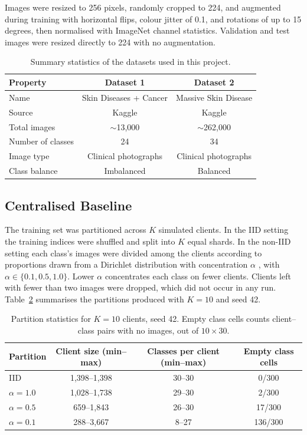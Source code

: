 \documentclass[12pt,openany,a4paper]{book}
\begin{document}
Images were resized to 256 pixels, randomly cropped to 224, and augmented during training with horizontal flips, colour jitter of 0.1, and rotations of up to 15 degrees, then normalised with ImageNet channel statistics. Validation and test images were resized directly to 224 with no augmentation.

\begin{table}[H]
  \centering
  \caption{Summary statistics of the datasets used in this project.}
  \label{tab:datasets}
  \renewcommand{\arraystretch}{1.3}
  \begin{tabular}{|l|c|c|}
    \hline
    \textbf{Property} & \textbf{Dataset 1} & \textbf{Dataset 2} \\ \hline
    Name & Skin Diseases + Cancer & Massive Skin Disease \\ \hline
    Source & Kaggle & Kaggle \\ \hline
    Total images & $\sim$13,000 & $\sim$262,000 \\ \hline
    Number of classes & 24 & 34 \\ \hline
    Image type & Clinical photographs & Clinical photographs \\ \hline
    Class balance & Imbalanced & Balanced \\ \hline
  \end{tabular}
\end{table}

\subsection{Centralised Baseline}
The training set was partitioned across $K$ simulated clients. In the IID setting the training indices were shuffled and split into $K$ equal shards. In the non-IID setting each class's images were divided among the clients according to proportions drawn from a Dirichlet distribution with concentration $\alpha$ \cite{hsuMeasuringEffectsNonIdentical2019}, with $\alpha \in \{0.1, 0.5, 1.0\}$. Lower $\alpha$ concentrates each class on fewer clients. Clients left with fewer than two images were dropped, which did not occur in any run. Table~\ref{tab:partition} summarises the partitions produced with $K = 10$ and seed 42.

\begin{table}[H]
  \centering
  \caption{Partition statistics for $K = 10$ clients, seed 42. Empty class cells counts client--class pairs with no images, out of $10 \times 30$.}
  \label{tab:partition}
  \begin{tabular}{lccc}
    \hline
    Partition & Client size (min--max) & Classes per client (min--max) & Empty class cells \\ \hline
    IID & 1,398--1,398 & 30--30 & 0/300 \\
    $\alpha = 1.0$ & 1,028--1,738 & 29--30 & 2/300 \\
    $\alpha = 0.5$ & 659--1,843 & 26--30 & 17/300 \\
    $\alpha = 0.1$ & 288--3,667 & 8--27 & 136/300 \\ \hline
  \end{tabular}
\end{table}
\end{document}
